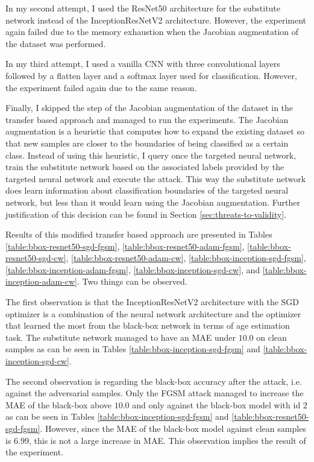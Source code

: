 In my second attempt, I used the ResNet50 architecture for the substitute network instead of the InceptionResNetV2 architecture. However, the experiment again failed due to the memory exhaustion when the Jacobian augmentation of the dataset was performed. 

In my third attempt, I used a vanilla CNN with three convolutional layers followed by a flatten layer and a softmax layer used for classification. However, the experiment failed again due to the same reason.


Finally, I skipped the step of the Jacobian augmentation of the dataset in the transfer based approach and managed to run the experiments. The Jacobian augmentation is a heuristic that computes how to expand the existing dataset so that new samples are closer to the boundaries of being classified as a certain class. Instead of using this heuristic, I query once the targeted neural network, train the substitute network based on the associated labels provided by the targeted neural network and execute the attack. This way the substitute network does learn information about classification boundaries of the targeted neural network, but less than it would learn using the Jacobian augmentation. Further justification of this decision can be found in Section \ref{sec:threats-to-validity}.

Results of this modified transfer based approach are presented in Tables
\ref{table:bbox-resnet50-sgd-fgsm},
\ref{table:bbox-resnet50-adam-fgsm}, 
\ref{table:bbox-resnet50-sgd-cw},
\ref{table:bbox-resnet50-adam-cw}, 
\ref{table:bbox-inception-sgd-fgsm},
\ref{table:bbox-inception-adam-fgsm}, 
\ref{table:bbox-inception-sgd-cw}, and
\ref{table:bbox-inception-adam-cw}. Two things can be observed.

The first observation is that the InceptionResNetV2 architecture with the SGD optimizer is a combination of the neural network architecture and the optimizer that learned the most from the black-box network in terms of age estimation task. The substitute network managed to have an MAE under $10.0$ on clean samples as can be seen in Tables \ref{table:bbox-inception-sgd-fgsm} and \ref{table:bbox-inception-sgd-cw}. 

The second observation is regarding the black-box accuracy after the attack, i.e. against the adversarial samples. Only the FGSM attack managed to increase the MAE of the black-box above $10.0$ and only against the black-box model with id 2 as can be seen in Tables \ref{table:bbox-inception-sgd-fgsm} and \ref{table:bbox-resnet50-sgd-fgsm}. However, since the MAE of the black-box model against clean samples is $6.99$, this is not a large increase in MAE. This observation implies the result of the experiment. 

